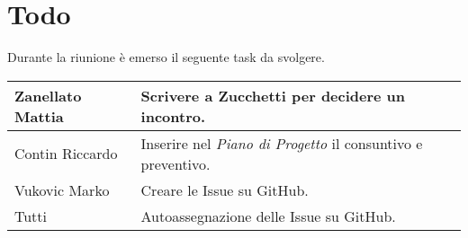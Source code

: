 \section{Todo}
Durante la riunione è emerso il seguente task da svolgere.

\begin{center}
  \begin{tabular}{|p{5cm}|p{7cm}|}
    \hline
    Zanellato Mattia & Scrivere a Zucchetti per decidere un incontro. \\ \hline
    Contin Riccardo & Inserire nel \textit{Piano di Progetto} il consuntivo e preventivo. \\ \hline
    Vukovic Marko & Creare le Issue su GitHub. \\ \hline
    Tutti & Autoassegnazione delle Issue su GitHub. \\ \hline
  \end{tabular}
\end{center}
